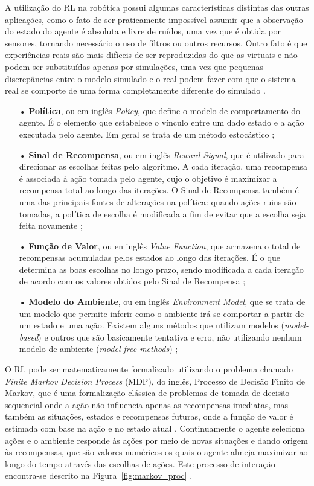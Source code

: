 \documentclass[a4paper]{ifacconf}
\begin{document}
A utilização do RL na robótica possui algumas características distintas das outras aplicações, como o fato de ser praticamente impossível assumir que a observação do estado do agente é absoluta e livre de ruídos, uma vez que é obtida por sensores, tornando necessário o uso de filtros ou outros recursos. Outro fato é que experiências reais são mais difíceis de ser reproduzidas do que as virtuais e não podem ser substituídas apenas por simulações, uma vez que pequenas discrepâncias entre o modelo simulado e o real podem fazer com que o sistema real se comporte de uma forma completamente diferente do simulado \cite{rl_rob_survey}.

\begin{itemize}
\item[•]\textbf{Política}, ou em inglês \textit{Policy}, que define o modelo de comportamento do agente. É o elemento que estabelece o vínculo entre um dado estado e a ação executada pelo agente. Em geral se trata de um método estocástico \cite{rl_rob_survey};
\item[•]\textbf{Sinal de Recompensa}, ou em inglês \textit{Reward Signal}, que é utilizado para direcionar as escolhas feitas pelo algoritmo. A cada iteração, uma recompensa é associada à ação tomada pelo agente, cujo o objetivo é maximizar a recompensa total ao longo das iterações. O Sinal de Recompensa também é uma das principais fontes de alterações na política: quando ações ruins são tomadas, a política de escolha é modificada a fim de evitar que a escolha seja feita novamente \cite{rl_rob_survey}; 
\item[•]\textbf{Função de Valor}, ou en inglês \textit{Value Function}, que armazena o total de recompensas acumuladas pelos estados ao longo das iterações. É o que determina as boas escolhas no longo prazo, sendo modificada a cada iteração de acordo com os valores obtidos pelo Sinal de Recompensa \cite{rl_rob_survey};
\item[•]\textbf{Modelo do Ambiente}, ou em inglês \textit{Environment Model}, que se trata de um modelo que permite inferir como o ambiente irá se comportar a partir de um estado e uma ação. Existem alguns métodos que utilizam modelos (\emph{model-based}) e outros que são basicamente tentativa e erro, não utilizando nenhum modelo de ambiente (\emph{model-free methods}) \cite{rl_rob_survey};
\end{itemize}

O RL pode ser matematicamente formalizado utilizando o problema chamado \emph{Finite Markov Decision Process} (MDP), do inglês, Processo de Decisão Finito de Markov, que é uma formalização clássica de problemas de tomada de decisão sequencial onde a ação não influencia apenas as recompensas imediatas, mas também as situações, estados e recompensas futuras, onde a função de valor é estimada com base na ação e no estado atual \cite{ql_model,markov_tut}. Continuamente o agente seleciona ações e o ambiente responde às ações por meio de novas situações e dando origem às recompensas, que são valores numéricos os quais o agente almeja maximizar ao longo do tempo através das escolhas de ações. Este processo de interação encontra-se descrito na Figura~\ref{fig:markov_proc} \cite{intro_to_rl}.
\end{document}
